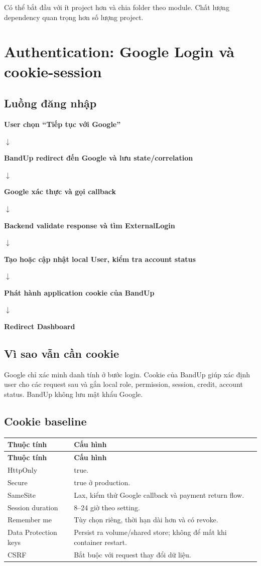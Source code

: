 \documentclass[11pt,a4paper]{article}
\newcommand{\flowarrow}{\par\centering\sffamily\color{BandBlue}\Large$\downarrow$\par}
\newcommand{\flowstep}[1]{\par\centering\sffamily\bfseries #1\par}
\begin{document}
Có thể bắt đầu với ít project hơn và chia folder theo module. Chất lượng dependency quan trọng hơn số lượng project.

\section{Authentication: Google Login và cookie-session}

\subsection{Luồng đăng nhập}
\begin{flowbox}
\flowstep{User chọn ``Tiếp tục với Google''}
\flowarrow
\flowstep{BandUp redirect đến Google và lưu state/correlation}
\flowarrow
\flowstep{Google xác thực và gọi callback}
\flowarrow
\flowstep{Backend validate response và tìm ExternalLogin}
\flowarrow
\flowstep{Tạo hoặc cập nhật local User, kiểm tra account status}
\flowarrow
\flowstep{Phát hành application cookie của BandUp}
\flowarrow
\flowstep{Redirect Dashboard}
\end{flowbox}

\subsection{Vì sao vẫn cần cookie}
Google chỉ xác minh danh tính ở bước login. Cookie của BandUp giúp xác định user cho các request sau và gắn local role, permission, session, credit, account status. BandUp không lưu mật khẩu Google.

\subsection{Cookie baseline}
\begin{longtable}{|P{0.28\textwidth}|P{0.60\textwidth}|}
\hline
\textbf{Thuộc tính} & \textbf{Cấu hình} \\ \hline
\endfirsthead
\hline
\textbf{Thuộc tính} & \textbf{Cấu hình} \\ \hline
\endhead
HttpOnly & true. \\ \hline
Secure & true ở production. \\ \hline
SameSite & Lax, kiểm thử Google callback và payment return flow. \\ \hline
Session duration & 8--24 giờ theo setting. \\ \hline
Remember me & Tùy chọn riêng, thời hạn dài hơn và có revoke. \\ \hline
Data Protection keys & Persist ra volume/shared store; không để mất khi container restart. \\ \hline
CSRF & Bắt buộc với request thay đổi dữ liệu. \\ \hline
\end{longtable}
\end{document}
